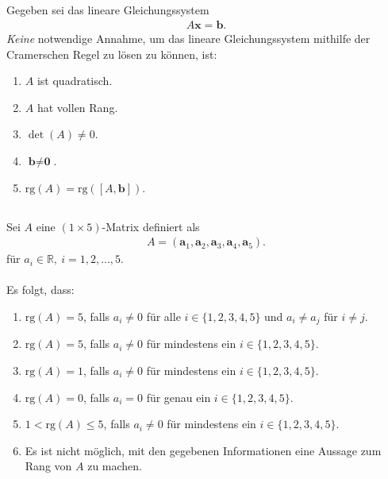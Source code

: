 \subsection*{}
Gegeben sei das lineare Gleichungssystem
\begin{align*}
	A \textbf{x} = \textbf{b}.
\end{align*}
\textit{Keine} notwendige Annahme, um das lineare Gleichungssystem mithilfe der Cramerschen Regel zu lösen zu können, ist:
\renewcommand{\labelenumi}{(\alph{enumi})}
\begin{enumerate}
\item 
$ A $ ist quadratisch.
\item
$ A $ hat vollen Rang.
\item
$ \det(A) \neq 0$.
\item
$ \textbf{b} \neq \textbf{0} $.
\item
$ \mathrm{rg}(A) = \mathrm{rg}([A,\textbf{b}])$.
\end{enumerate}
\newpage
\subsection*{}
Sei $ A $ eine $ (1 \times 5) $-Matrix definiert als
\begin{align*}
	A
	=
	\left(
	\textbf{a}_1,
	\textbf{a}_2,
	\textbf{a}_3,
	\textbf{a}_4,
	\textbf{a}_5
	\right).
\end{align*}
für $ a_i \in \mathbb{R}, \ i = 1,2,...,5 $.\\
\\
Es folgt, dass:
\renewcommand{\labelenumi}{(\alph{enumi})}
\begin{enumerate}
	\item 
	$ \mathrm{rg}(A) = 5 $, falls $ a_i \neq 0 $ für alle $ i \in \{1,2,3,4,5\} $ und $ a_i \neq a_j $ für $ i \neq j $.
	\item
	$ \mathrm{rg}(A) = 5 $, falls $ a_i \neq 0 $ für mindestens ein $ i \in \{1,2,3,4,5\} $.
	\item
	$ \mathrm{rg}(A) = 1 $, falls $ a_i \neq 0 $ für mindestens ein $ i \in \{1,2,3,4,5\} $.
	\item
	$ \mathrm{rg}(A) = 0 $, falls $ a_i = 0 $ für genau ein $ i \in \{1,2,3,4,5\} $.
	\item
	$1 <  \mathrm{rg}(A)\leq 5 $, falls $ a_i \neq 0 $ für mindestens ein $ i \in \{1,2,3,4,5\} $.
	\item 
	Es ist nicht möglich, mit den gegebenen Informationen eine Aussage zum Rang von $ A $ zu machen.
\end{enumerate}
\ \\

